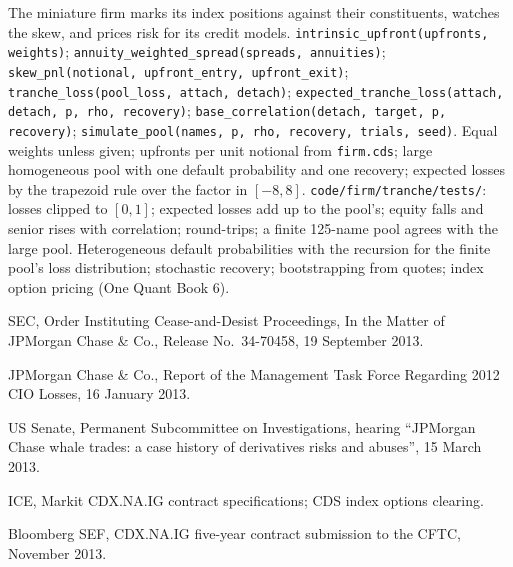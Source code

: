 \begin{build}
 The miniature firm marks its index positions against their
constituents, watches the skew, and prices  risk for its credit models.
 \texttt{intrinsic\_upfront(upfronts, weights)};
\texttt{annuity\_weighted\_spread(spreads, annuities)}; \texttt{skew\_pnl(notional,
upfront\_entry, upfront\_exit)}; \texttt{tranche\_loss(pool\_loss, attach, detach)};
\texttt{expected\_tranche\_loss(attach, detach, p, rho, recovery)};
\texttt{base\_correlation(detach, target, p, recovery)}; \texttt{simulate\_pool(names, p,
rho, recovery, trials, seed)}.
 Equal weights unless given; upfronts per unit notional from
\texttt{firm.cds}; large homogeneous pool with one default probability and one
recovery; expected losses by the trapezoid rule over the factor in $[-8, 8]$.
 \texttt{code/firm/tranche/tests/}:  losses clipped to
$[0, 1]$;  expected losses add up to the pool's; equity falls and senior rises
with correlation;  round-trips; a finite 125-name pool agrees with the
large pool.
 Heterogeneous default probabilities with the recursion for the
finite pool's loss distribution; stochastic recovery; bootstrapping 
from  quotes; index option pricing (One Quant Book 6).
\end{build}

\begin{omsources}
\item SEC, Order Instituting Cease-and-Desist Proceedings, In the Matter of JPMorgan
Chase \& Co., Release No.~34-70458, 19 September 2013.
\item JPMorgan Chase \& Co., Report of the Management Task Force Regarding 2012 CIO
Losses, 16 January 2013.
\item US Senate, Permanent Subcommittee on Investigations, hearing ``JPMorgan Chase
whale trades: a case history of derivatives risks and abuses'', 15 March 2013.
\item ICE, Markit CDX.NA.IG contract specifications; CDS index options clearing.
\item Bloomberg SEF, CDX.NA.IG five-year contract submission to the CFTC, November 2013.
\end{omsources}

